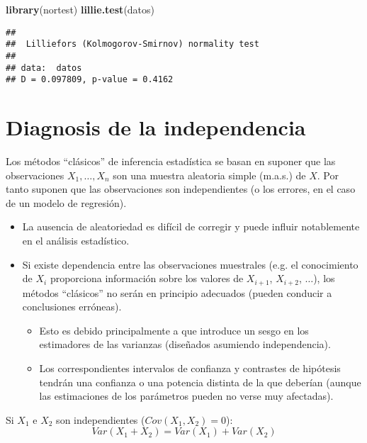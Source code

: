 \documentclass[
]{book}
\newenvironment{Shaded}{\begin{snugshade}}{\end{snugshade}}
\newcommand{\KeywordTok}[1]{\textcolor[rgb]{0.13,0.29,0.53}{\textbf{#1}}}
\newcommand{\NormalTok}[1]{#1}
\theoremstyle{break}
\theoremstyle{definition}
\theoremstyle{definition}
\theoremstyle{definition}
\theoremstyle{remark}
\begin{document}
\begin{Shaded}
\begin{Highlighting}[]
\KeywordTok{library}\NormalTok{(nortest)}
\KeywordTok{lillie.test}\NormalTok{(datos)}
\end{Highlighting}
\end{Shaded}

\begin{verbatim}
## 
##  Lilliefors (Kolmogorov-Smirnov) normality test
## 
## data:  datos
## D = 0.097809, p-value = 0.4162
\end{verbatim}

\hypertarget{diagnosis-de-la-independencia}{%
\section{Diagnosis de la independencia}\label{diagnosis-de-la-independencia}}

Los métodos ``clásicos'' de inferencia estadística se basan en
suponer que las observaciones \(X_{1},\ldots,X_{n}\) son una muestra
aleatoria simple (m.a.s.) de \(X\). Por tanto suponen que
las observaciones son independientes (o los errores, en el caso de un
modelo de regresión).

\begin{itemize}
\item
  La ausencia de aleatoriedad es difícil de corregir y puede influir
  notablemente en el análisis estadístico.
\item
  Si existe dependencia entre las observaciones muestrales (e.g.
  el conocimiento de \(X_{i}\) proporciona información sobre los valores
  de \(X_{i+1}\), \(X_{i+2}\), \(\ldots\)), los métodos ``clásicos'' no serán
  en principio adecuados (pueden conducir a conclusiones erróneas).

  \begin{itemize}
  \item
    Esto es debido principalmente a que introduce un sesgo en los
    estimadores de las varianzas (diseñados asumiendo independencia).
  \item
    Los correspondientes intervalos de confianza y
    contrastes de hipótesis tendrán una confianza o una potencia
    distinta de la que deberían (aunque las estimaciones de los parámetros
    pueden no verse muy afectadas).
  \end{itemize}
\end{itemize}

Si \(X_{1}\) e \(X_{2}\) son independientes (\(Cov(X_{1},X_{2})=0\)):
\[Var(X_{1}+X_{2})=Var(X_{1})+Var(X_{2})\]
\end{document}
